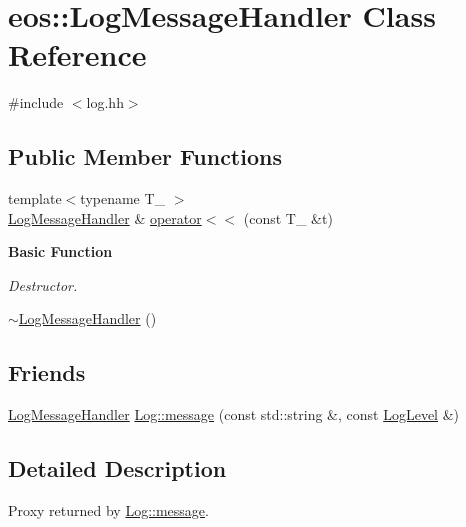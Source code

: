 \hypertarget{classeos_1_1LogMessageHandler}{
\section{eos::LogMessageHandler Class Reference}
\label{classeos_1_1LogMessageHandler}
}


{\ttfamily \#include $<$log.hh$>$}\subsection*{Public Member Functions}
\begin{DoxyCompactItemize}
\item 
{\footnotesize template$<$typename T\_\- $>$ }\\\hyperlink{classeos_1_1LogMessageHandler}{LogMessageHandler} \& \hyperlink{classeos_1_1LogMessageHandler_a9e80fc226b5a9e496b4458f4dcac8edf}{operator$<$$<$} (const T\_\- \&t)
\end{DoxyCompactItemize}
\begin{Indent}{\bf Basic Function}\par
{\em \label{_amgrp9ac0a05bc9f1ecee9a728c52951f9f43}
 Destructor. }\begin{DoxyCompactItemize}
\item 
\hyperlink{classeos_1_1LogMessageHandler_aad1be08a8a665dea99f4dd08a18c8e1f}{$\sim$LogMessageHandler} ()
\end{DoxyCompactItemize}
\end{Indent}
\subsection*{Friends}
\begin{DoxyCompactItemize}
\item 
\hyperlink{classeos_1_1LogMessageHandler}{LogMessageHandler} \hyperlink{classeos_1_1LogMessageHandler_a9c07080df7f9a92cc12bc4572a1353ca}{Log::message} (const std::string \&, const \hyperlink{namespaceeos_ad6b42a08a08a1b63498f3f262bd15602}{LogLevel} \&)
\end{DoxyCompactItemize}


\subsection{Detailed Description}
Proxy returned by \hyperlink{classeos_1_1Log_a554d8b48664cf871f1fcddf52e6f8530}{Log::message}. 

